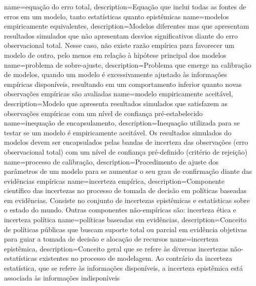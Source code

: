 {
    name=equação do erro total,
    description={Equação que inclui todas as fontes de erros em um modelo, tanto estatísticas quanto epistêmicas}
}
{
    name=modelos empiricamente equivalentes,
    description={Modelos diferentes mas que apresentam resultados simulados que não apresentam desvios significativos diante do erro observacional total. Nesse caso, não existe razão empírica para favorecer um modelo de outro, pelo menos em relação à hipótese principal dos modelos}
}
{
    name=problema de sobre-ajuste,
    description={Problema que emerge na calibração de modelos, quando um modelo é excessivamente ajustado às informações empíricas disponíveis, resultando em um comportamento inferior quanto novas observações empíricas são avaliadas}
}
{
    name=modelo empiricamente aceitável,
    description={Modelo que apresenta resultados simulados que satisfazem as observações empíricas com um nível de confiança pré-estabelecido}
}
{
    name=inequação de encapsulamento,
    description={Inequação utilizada para se testar se um modelo é empiricamente aceitável. Os resultados simulados do modelos devem ser encapsulados pelas bandas de incerteza das observações (erro observacional total) com um nível de confiança pré-definido (critério de rejeição)}
}
{
    name=processo de calibração,
    description={Procedimento de ajuste dos parâmetros de um modelo para se aumentar o seu grau de confirmação diante das evidências empíricas}
}
{
    name=incerteza empírica,
    description={Componente científico das incertezas no processo de tomada de decisão em políticas baseadas em evidências. Consiste no conjunto de incertezas epistêmicas e estatísticas sobre o estado do mundo. Outras componentes não-empíricas são: incerteza ética e incerteza política}
}
{
    name=políticas baseadas em evidências,
    description={Conceito de políticas públicas que buscam suporte total ou parcial em evidência objetivas para guiar a tomada de decisão e alocação de recursos}
}
{
    name=incerteza epistêmica,
    description={Conceito geral que se refere às diversas incertezas não-estatísticas existentes no processo de modelagem. Ao contrário da incerteza estatística, que se refere às informações disponíveis, a incerteza epistêmica está associada às informações indisponíveis}
}
